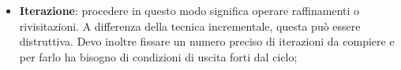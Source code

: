 \begin{itemize}
	\item \textbf{Iterazione}: procedere in questo modo significa operare raffinamenti o rivisitazioni. A differenza della tecnica incrementale, questa può essere distruttiva. \newline
Devo inoltre fissare un numero preciso di iterazioni da compiere e per farlo ha bisogno di condizioni di uscita forti dal ciclo;

\end{itemize}